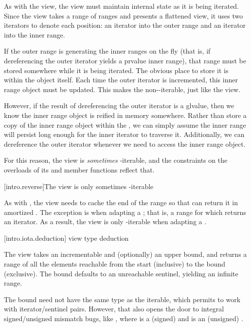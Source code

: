 {\pnum
As with the  view, the  view must maintain internal
state as it is being iterated. Since the  view takes a range of
ranges and presents a flattened view, it uses two iterators to denote each
position: an iterator into the outer range and an iterator into the inner range.

\pnum
If the outer range is generating the inner ranges on the fly (that is, if
dereferencing the outer iterator yields a prvalue inner range), that range must
be stored somewhere while it is being iterated. The obvious place to store it
is within the  object itself. Each time the outer iterator is
incremented, this inner range object must be updated. This makes the
 non--iterable, just like the  view.

\pnum
However, if the result of dereferencing the outer iterator is a glvalue, then
we know the inner range object is reified in memory somewhere. Rather than store
a copy of the inner range object within the , we can simply
assume the inner range will persist long enough for the inner iterator to
traverse it. Additionally, we can dereference the outer iterator whenever we
need to access the inner range object.

\pnum
For this reason, the  view is \textit{sometimes}
-iterable, and the constraints on the  overloads of
its  and  member functions reflect that.

[intro.reverse]{The  view is only sometimes -iterable}

\pnum
As with , the  view needs to cache the end of the
range so that  can return it in amortized . The exception
is when adapting a ; that is, a range for which 
returns an iterator. As a result, the  view is only
-iterable when adapting a .

[intro.iota.deduction]{ view type deduction}

\pnum
The  view takes an incrementable and (optionally) an upper bound,
and returns a range of all the elements reachable from the start (inclusive) to
the bound (exclusive). The bound defaults to an unreachable sentinel, yielding
an infinite range.

\pnum
The bound need not have the same type as the iterable, which permits 
to work with iterator/sentinel pairs. However, that also opens the door to
integral signed/unsigned mismatch bugs, like ,
where  is a (signed)  and  is an (unsigned)
.

}
